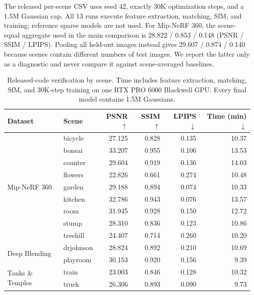 \documentclass[sigconf]{acmart}
\begin{document}
The released per-scene CSV uses seed 42, exactly 30K optimization steps, and a 1.5M Gaussian cap. All 13 runs execute feature extraction, matching, SfM, and training; reference sparse models are not used. For Mip-NeRF 360, the scene-equal aggregate used in the main comparison is 28.822 / 0.853 / 0.148 (PSNR / SSIM / LPIPS). Pooling all held-out images instead gives 29.607 / 0.874 / 0.140 because scenes contain different numbers of test images. We report the latter only as a diagnostic and never compare it against scene-averaged baselines.

\begin{table}[t]
    \centering
    \footnotesize
    \setlength\tabcolsep{5pt}
    \caption{Released-code verification by scene. Time includes feature extraction, matching, SfM, and 30K-step training on one RTX PRO 6000 Blackwell GPU. Every final model contains 1.5M Gaussians.}
    \label{tab:supp_release_per_scene}
    \begin{tabular}{llrrrr}
        \toprule
        Dataset & Scene & PSNR$\uparrow$ & SSIM$\uparrow$ & LPIPS$\downarrow$ & Time (min)$\downarrow$ \\
        \midrule
        \multirow{9}{*}{Mip-NeRF 360}
        & bicycle & 27.125 & 0.828 & 0.135 & 10.37 \\
        & bonsai & 33.207 & 0.955 & 0.106 & 13.53 \\
        & counter & 29.604 & 0.919 & 0.136 & 14.03 \\
        & flowers & 22.826 & 0.661 & 0.274 & 10.48 \\
        & garden & 29.188 & 0.894 & 0.074 & 10.33 \\
        & kitchen & 32.786 & 0.943 & 0.076 & 13.57 \\
        & room & 31.945 & 0.928 & 0.150 & 12.72 \\
        & stump & 28.310 & 0.836 & 0.123 & 10.86 \\
        & treehill & 24.407 & 0.714 & 0.260 & 10.20 \\
        \midrule
        \multirow{2}{*}{Deep Blending}
        & drjohnson & 28.824 & 0.892 & 0.210 & 10.69 \\
        & playroom & 30.153 & 0.920 & 0.156 & 9.39 \\
        \midrule
        \multirow{2}{*}{Tanks \& Temples}
        & train & 23.003 & 0.846 & 0.128 & 10.32 \\
        & truck & 26.306 & 0.893 & 0.090 & 9.73 \\
        \bottomrule
    \end{tabular}
\end{table}
\end{document}
